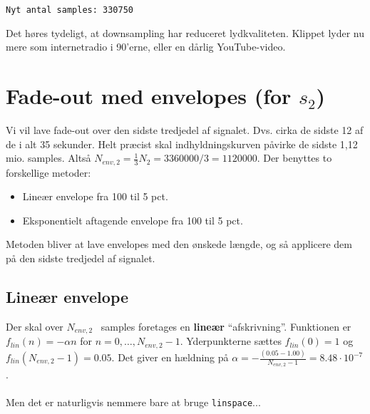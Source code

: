 \documentclass[a4paper]{report}
\begin{document}
        \color{lightgray} \begin{verbatim}Nyt antal samples: 330750
\end{verbatim} \color{black}
    \begin{par}
Det høres tydeligt, at downsampling har reduceret lydkvaliteten. Klippet lyder nu mere som internetradio i 90'erne, eller en dårlig YouTube-video.
\end{par} 



\section{Fade-out med envelopes (for $s_2$)}

        \begin{par}

Vi vil lave fade-out over den sidste tredjedel af signalet.
Dvs. cirka de sidste 12 af de i alt 35 sekunder.
Helt præcist skal indhyldningskurven påvirke de sidste 1,12 mio. samples.
Altså $N_{env,2} = \frac{1}{3} N_2 = 3360000/3 = 1120000$.
Der benyttes to forskellige metoder:
\begin{itemize}
\item Lineær envelope fra 100 til 5 pct.
\item Eksponentielt aftagende envelope fra 100 til 5 pct.
\end{itemize}
Metoden bliver at lave envelopes med den ønskede længde, og så applicere
dem på den sidste tredjedel af signalet.\\

\end{par} 
\begin{par}
\subsection{Lineær envelope}
\end{par} 
\begin{par}

Der skal over $N_{env,2}$~ samples foretages en \textbf{lineær} ``afskrivning''.
Funktionen er $f_{lin}(n) = -\alpha n$ for $n=0,\ldots,N_{env,2}-1$.
Yderpunkterne sættes $f_{lin}(0) = 1$ og $f_{lin}(N_{env,2}-1) = 0.05$.
Det giver en hældning på $ \alpha = -\frac{(0.05-1.00)}{N_{env,2}-1}=8.48\cdot 10^{-7}$.\\\\
Men det er naturligvis nemmere bare at bruge \texttt{linspace}...

\end{par} 
\end{document}

